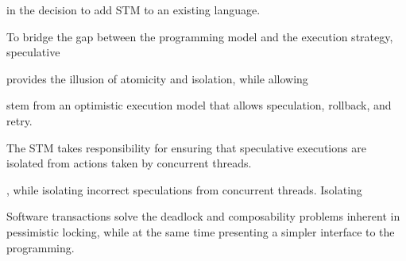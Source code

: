 in the decision to add STM to an existing language.


To bridge the gap between the programming model and the execution
strategy, speculative 

provides the illusion of
atomicity and isolation, while allowing 


stem from an optimistic execution model that allows speculation, rollback,
and retry.  

The STM takes responsibility for ensuring that speculative
executions are isolated from actions taken by concurrent threads.

, while isolating incorrect speculations from concurrent threads.
Isolating 

Software transactions
solve the deadlock and composability problems inherent in pessimistic
locking, while at the same time presenting a simpler interface to the
programming.
